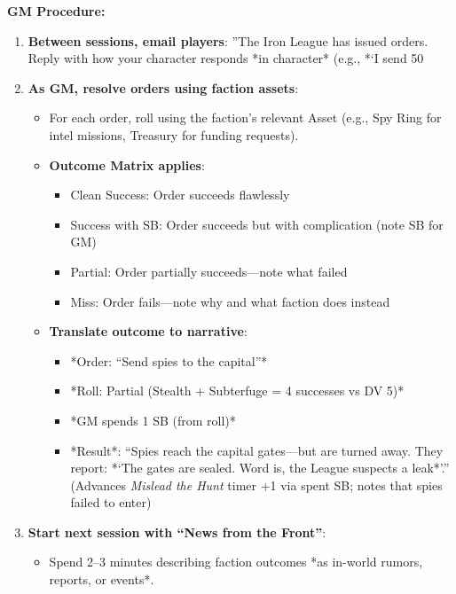 {{\textbf{GM Procedure:}
\begin{enumerate}
  \item \textbf{Between sessions, email players}: ''The Iron League has issued orders. Reply with how your character responds *in character* (e.g., *`I send 50%
  \item \textbf{As GM, resolve orders using faction assets}: 
        \begin{itemize}
          \item For each order, roll using the faction's relevant Asset (e.g., Spy Ring for intel missions, Treasury for funding requests). 
          \item \textbf{Outcome Matrix applies}: 
                \begin{itemize}
                  \item Clean Success: Order succeeds flawlessly 
                  \item Success with SB: Order succeeds but with complication (note SB for GM) 
                  \item Partial: Order partially succeeds---note what failed 
                  \item Miss: Order fails---note why and what faction does instead 
                \end{itemize}
          \item \textbf{Translate outcome to narrative}: 
                \begin{itemize}
                  \item *Order: ``Send spies to the capital''* 
                  \item *Roll: Partial (Stealth + Subterfuge = 4 successes vs DV 5)* 
                  \item *GM spends 1 SB (from roll)* 
                  \item *Result*: ``Spies reach the capital gates---but are turned away. They report: *`The gates are sealed. Word is, the League suspects a leak*'.'' (Advances \emph{Mislead the Hunt} timer +1 via spent SB; notes that spies failed to enter) 
                \end{itemize}
        \end{itemize}
  \item \textbf{Start next session with ``News from the Front''}: 
        \begin{itemize}
          \item Spend 2--3 minutes describing faction outcomes *as in-world rumors, reports, or events*. 

\end{itemize}
\end{enumerate}}}
